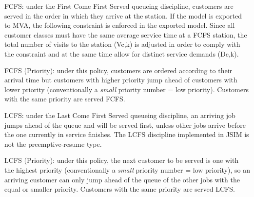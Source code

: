 \begin{description*}
\item[FCFS:] under the First Come First Served queueing discipline, customers are served in the order in which they arrive at the station. If the model is exported to MVA, the following constraint is enforced in the exported model. Since all customer classes must have the same average service time at a FCFS station, the total number of visits to the station (Vc,k) is adjusted in order to comply with the constraint and at the same time allow for distinct service demands (Dc,k).
\item[FCFS (Priority):] under this policy, customers are ordered according to their arrival time but customers with higher priority jump ahead of customers with lower priority (conventionally a \emph{small} priority number = low priority). Customers with the same priority are served FCFS.
\item[LCFS:] under the Last Come First Served queueing discipline, an arriving job jumps ahead of the queue and will be served first, unless other jobs arrive before the one currently in service finishes. The LCFS discipline implemented in JSIM is not the preemptive-resume type. 
\item[LCFS (Priority):] under this policy, the next customer to be served is one with the highest priority (conventionally a \emph{small} priority number = low priority), so an arriving customer can only jump ahead of the queue of the other jobs with the equal or smaller priority. Customers with the same priority are served LCFS.
\end{description*}

